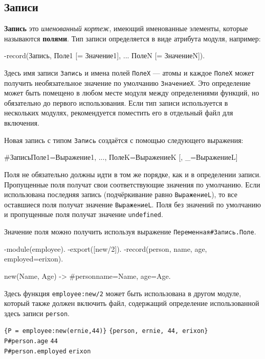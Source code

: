 \subsection{Записи}
\label{datatypes:record}

\textbf{Запись} это \emph{именованный кортеж}, имеющий именованные элементы,
которые называются \textbf{полями}. Тип записи определяется в виде атрибута 
модуля, например:

\begin{erlangru}
-record(Запись, {Поле1 [= Значение1],
                 ...
                 ПолеN [= ЗначениеN]}).
\end{erlangru}

Здесь имя записи \texttt{Запись} и имена полей \texttt{ПолеХ} --- атомы и каждое
\texttt{ПолеX} может получить необязательное значение по умолчанию
\texttt{ЗначениеX}. Это определение может быть помещено в любом месте модуля 
между определениями функций, но обязательно до первого использования. Если тип
записи используется в нескольких модулях, рекомендуется поместить его в
отдельный файл для включения.

Новая запись с типом \texttt{Запись} создаётся с помощью следующего выражения:

\begin{erlangru}
#Запись{Поле1=Выражение1, ..., ПолеK=ВыражениеK [, _=ВыражениеL]}
\end{erlangru}

Поля не обязательно должны идти в том же порядке, как и в определении записи.
Пропущенные поля получат свои соответствующие значения по умолчанию. Если 
использована последняя запись (подчёркивание равно \texttt{ВыражениеL}), то все
оставшиеся поля получат значение \texttt{ВыражениеL}. Поля без значений по
умолчанию и пропущенные поля получат значение \texttt{undefined}.

Значение поля можно получить используя выражение 
\texttt{Переменная\#Запись.Поле}.

\begin{erlang}
-module(employee).
-export([new/2]).
-record(person, {name, age, employed=erixon}).

new(Name, Age) -> #person{name=Name, age=Age}.
\end{erlang}

Здесь функция \texttt{employee:new/2} может быть использована в другом модуле,
который также должен включить файл, содержащий определение использованной здесь
записи \texttt{person}.

\texttt{\{P = employee:new(ernie,44)\}} \resultingin \texttt{\{person, ernie, 
	44, erixon\}} \\
\texttt{P\#person.age} \resultingin \texttt{44} \\
\texttt{P\#person.employed} \resultingin \texttt{erixon}

